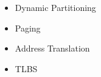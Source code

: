 \documentclass[12pt]{article}
\begin{document}
\begin{itemize}
    \item Dynamic Partitioning
    \item Paging
    \item Address Translation
    \item TLBS
\end{itemize}
\end{document}
